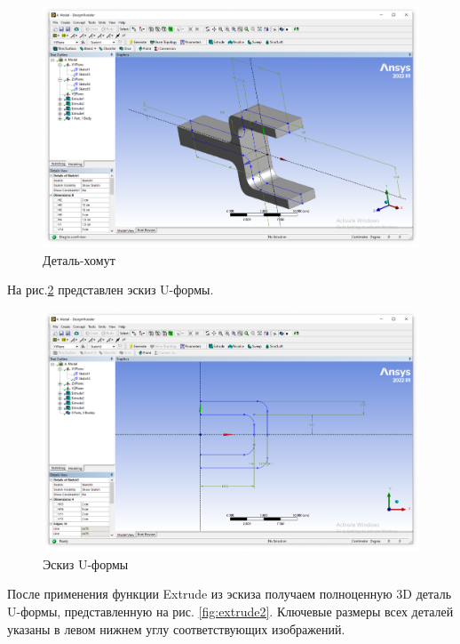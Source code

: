 \begin{figure}[H] 
	\center
	\includegraphics[width=\textwidth]{images/extrude1.png}
	\caption{Деталь-хомут} 
	\label{fig:extrude1}
\end{figure}

На рис.\ref{fig:sketch2} представлен эскиз U-формы.

\begin{figure}[H] 
	\center
	\includegraphics[width=\textwidth]{images/sketch2.png}
	\caption{Эскиз U-формы} 
	\label{fig:sketch2}
\end{figure}

После применения функции Extrude из эскиза получаем полноценную 3D деталь U-формы, представленную на рис. \ref{fig:extrude2}. Ключевые размеры всех деталей указаны в левом нижнем углу соответствующих изображений.

